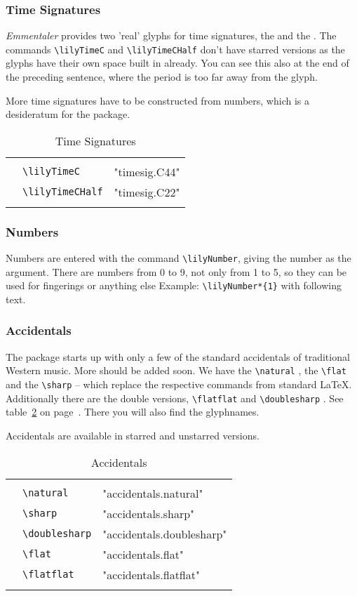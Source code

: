 \documentclass{article}
\newcommand*{\cmd}[1]{\texttt{\textbackslash #1}}
\newcommand{\tmpCaption}{} %
\newcommand{\tmpLabel}{}
\newenvironment{reftable}[2]
	{%
		\renewcommand{\tmpCaption}{#1}
		\renewcommand{\tmpLabel}{#2}
		\begin{table}[ht]
		\begin{center}
		\begin{tabular}[t]{lll}
		\hline
		&\\
	}
	{%
		&\\
		\hline
		\end{tabular}
		\caption{\tmpCaption}
		\label{table:\tmpLabel}
		\end{center}
		\end{table}
	}
\begin{document}
\subsubsection{Time Signatures}
\emph{Emmentaler} provides two 'real' glyphs for time signatures, the \lilyTimeC and the \lilyTimeCHalf. The commands \cmd{lilyTimeC} and \cmd{lilyTimeCHalf} don't have starred versions as the glyphs have their own space built in already. You can see this also at the end of the preceding sentence, where the period is too far away from the glyph.

More time signatures have to be constructed from numbers, which is a desideratum for the package.

\begin{reftable}{Time Signatures}{timesignatures}
\lilyTimeC & \cmd{lilyTimeC} & "timesig.C44"\\
\lilyTimeCHalf & \cmd{lilyTimeCHalf} & "timesig.C22"\\
\end{reftable}


\subsubsection{Numbers}
Numbers are entered with the command \cmd{lilyNumber}, giving the number as the argument. There are numbers from 0 to 9, not only from 1 to 5, so they can be used for fingerings or anything else Example: \cmd{lilyNumber*\{1\}}  with following text.


\subsubsection{Accidentals}
The package starts up with only a few of the standard accidentals of traditional Western music. More should be added soon. We have the \cmd{natural} \natural, the \cmd{flat} \flat* and the \cmd{sharp} \sharp* -- which replace the respective commands from standard \LaTeX. Additionally there are the double versions, \cmd{flatflat} \flatflat* and \cmd{doublesharp} \doublesharp. See table~\ref{table:accidentals} on page~\pageref{table:accidentals}. There you will also find the glyphnames.

Accidentals are available in starred and unstarred versions.

\begin{reftable}{Accidentals}{accidentals}
\natural & \cmd{natural} & "accidentals.natural"\\
\sharp & \cmd{sharp} & "accidentals.sharp"\\
\doublesharp & \cmd{doublesharp} & "accidentals.doublesharp"\\
\flat & \cmd{flat} & "accidentals.flat"\\
\flatflat & \cmd{flatflat} & "accidentals.flatflat"\\
\end{reftable}
\end{document}
